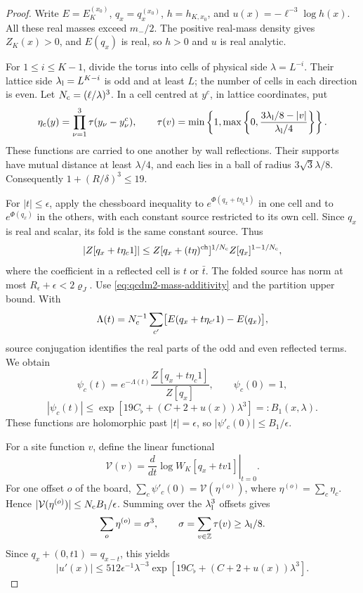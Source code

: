 \documentclass[11pt,letterpaper,reqno]{amsart}
\theoremstyle{definition}
\theoremstyle{remark}
\begin{document}
\begin{proof}
Write \(E=E_K^{(x_0)}\), \(q_x=q_x^{(x_0)}\), \(h=h_{K,x_0}\),
and \(u(x)=-\ell^{-3}\log h(x)\).
All these real masses exceed \(m_-/2\). The positive
real-mass density gives $Z_K(x)>0$, and \(E(q_x)\) is real,
so \(h>0\) and \(u\) is
real analytic.

For \(1\le i\le K-1\), divide the torus into cells of
physical side \(\lambda=L^{-i}\). Their lattice side
\(\lambda_{\rm l}=L^{K-i}\) is odd and at least \(L\);
the number of cells in each direction is even.
Let \(N_{\rm c}=(\ell/\lambda)^3\).
In a cell centred at \(y^c\), in lattice coordinates, put
\[
 \eta_c(y)=\prod_{\nu=1}^3\tau(y_\nu-y^c_\nu),\qquad
 \tau(v)=\min\left\{1,\max\left\{0,
          \frac{3\lambda_{\rm l}/8-|v|}{\lambda_{\rm l}/4}
                                      \right\}\right\}.
\]
These functions are carried to one another by wall reflections.
Their supports have mutual distance at least \(\lambda/4\),
and each lies in a ball of radius \(3\sqrt3\lambda/8\).
Consequently \(1+(R/\delta)^3\le19\).

For \(|t|\le\epsilon\), apply the chessboard inequality to
\(e^{\Phi(q_x+t\eta_c1)}\) in one cell and to
\(e^{\Phi(q_x)}\) in the others, with each constant source
restricted to its own cell. Since \(q_x\) is real and scalar,
its fold is the same constant source. Thus
\[
 |Z[q_x+t\eta_c1]|
 \le Z[q_x+(t\eta)^{\rm ch}]^{1/N_{\rm c}}
                         Z[q_x]^{1-1/N_{\rm c}},
\]
where the coefficient in a reflected cell is \(t\) or \(\bar t\).
The folded source has norm at most
\(R_\epsilon+\epsilon<2\varrho_J\).
Use \eqref{eq:qcdm2-mass-additivity} and the partition upper
bound. With
\[
 \Lambda(t)=N_{\rm c}^{-1}\sum_{c'}
           \bigl[E(q_x+t\eta_{c'}1)-E(q_x)\bigr],
\]
source conjugation identifies the real parts of the odd and
even reflected terms. We obtain
\[
 \psi_c(t)=e^{-\Lambda(t)}\frac{Z[q_x+t\eta_c1]}{Z[q_x]},
 \qquad \psi_c(0)=1,
\]
\[
 |\psi_c(t)|
 \le \exp\left[19C_\flat+(C+2+u(x))\lambda^3\right]
       =:B_1(x,\lambda).
\]
These functions are holomorphic past \(|t|=\epsilon\),
so \(|\psi'_c(0)|\le B_1/\epsilon\).

For a site function \(v\), define the linear functional
\[
 \mathcal V(v)=
 \left.\frac{d}{dt}\log W_K[q_x+tv1]\right|_{t=0}.
\]
For one offset \(o\) of the board,
\(\sum_c\psi'_c(0)=\mathcal V(\eta^{(o)})\), where
\(\eta^{(o)}=\sum_c\eta_c\). Hence
\(|\mathcal V(\eta^{(o)})|\le N_{\rm c}B_1/\epsilon\).
Summing over the \(\lambda_{\rm l}^3\) offsets gives
\[
 \sum_o\eta^{(o)}=\sigma^3,\qquad
 \sigma=\sum_{v\in\mathbb Z}\tau(v)\ge\lambda_{\rm l}/8.
\]
Since \(q_x+(0,t1)=q_{x-t}\), this yields
\[
 |u'(x)|\le512\epsilon^{-1}\lambda^{-3}
       \exp\left[19C_\flat+(C+2+u(x))\lambda^3\right].
\]


\end{proof}
\end{document}
